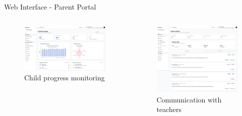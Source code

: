 \documentclass[aspectratio=169]{beamer}
\begin{document}
\begin{frame}{Web Interface - Parent Portal}
    \begin{columns}
        \begin{figure}
            \includegraphics[width=\textwidth,height=0.55\textheight,keepaspectratio]{../pfe-pics/parent/Screenshot 2025-06-09 at 22-58-13 Vite React TS.png}
            \caption{Child progress monitoring}
        \end{figure}
        \begin{figure}
            \includegraphics[width=\textwidth,height=0.55\textheight,keepaspectratio]{../pfe-pics/parent/Screenshot 2025-06-09 at 22-59-25 Vite React TS.png}
            \caption{Communication with teachers}
        \end{figure}
    \end{columns}
\end{frame}
\end{document}
